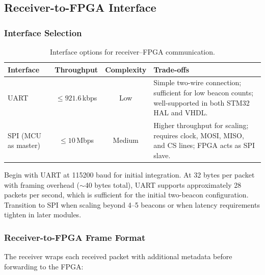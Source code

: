 \documentclass[11pt,letterpaper]{article}
\begin{document}
	\subsection{Receiver-to-FPGA Interface}
	
	\subsubsection{Interface Selection}
	
	\begin{table}[ht!]
		\centering
		\caption{Interface options for receiver--FPGA communication.}
		\label{tab:interface}
		\renewcommand{\arraystretch}{1.3}
		\begin{tabularx}{\textwidth}{l c c X}
			\toprule
			\textbf{Interface} & \textbf{Throughput} & \textbf{Complexity} & \textbf{Trade-offs} \\
			\midrule
			UART & $\leq 921.6$\,kbps & Low & Simple two-wire connection; sufficient for low beacon counts; well-supported in both STM32 HAL and VHDL. \\
			SPI (MCU as master) & $\leq 10$\,Mbps & Medium & Higher throughput for scaling; requires clock, MOSI, MISO, and CS lines; FPGA acts as SPI slave. \\
			\bottomrule
		\end{tabularx}
	\end{table}
	
	\begin{tcolorbox}[infobox={Recommendation}]
		Begin with UART at 115200 baud for initial integration. At 32 bytes per packet with framing overhead ($\sim$40 bytes total), UART supports approximately 28 packets per second, which is sufficient for the initial two-beacon configuration. Transition to SPI when scaling beyond 4--5 beacons or when latency requirements tighten in later modules.
	\end{tcolorbox}
	
	\subsubsection{Receiver-to-FPGA Frame Format}
	
	The receiver wraps each received packet with additional metadata before forwarding to the FPGA:
	
\end{document}
